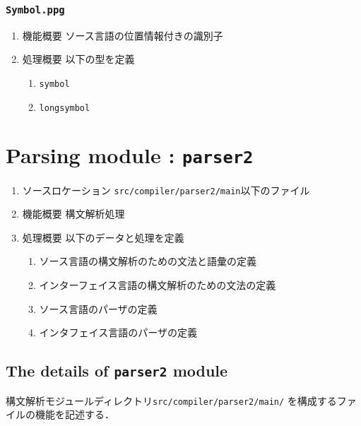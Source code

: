 \documentclass{jbook}
\newcommand{\txt}[2]{#2}
\newcommand{\code}[1]{\mbox{\large\tt #1}}
\begin{document}
\subsection{\code{Symbol.ppg}}
\begin{enumerate}
\item 機能概要 ソース言語の位置情報付きの識別子
\item 処理概要 
以下の型を定義
\begin{enumerate}
\item \code{symbol}
\item \code{longsymbol}
\end{enumerate}
\end{enumerate}
\else%
\fi%


% 
\chapter{\txt
{構文解析モジュール：\code{parser2}}
{Parsing module : \code{parser2}}
}
\label{chap:parsing}
\ifjp%
\begin{enumerate}
\item ソースロケーション \code{src/compiler/parser2/main}以下のファイル
\item 機能概要
	構文解析処理
\item 処理概要
以下のデータと処理を定義
\begin{enumerate}
\item ソース言語の構文解析のための文法と語彙の定義
\item インターフェイス言語の構文解析のための文法の定義
\item ソース言語のパーザの定義
\item インタフェイス言語のパーザの定義
\end{enumerate}
\end{enumerate}
\else%
\fi%


\section{\txt{\code{parser2}モジュールの処理の詳細}{The details of \code{parser2} module}}
\ifjp%
	構文解析モジュールディレクトリ\code{src/compiler/parser2/main/}
を構成するファイルの機能を記述する．
\end{document}
